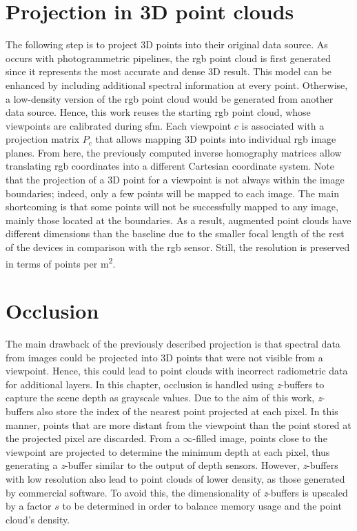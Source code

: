 \section{Projection in 3D point clouds}

The following step is to project 3D points into their original data source. As occurs with photogrammetric pipelines, the \acrshort{rgb} point cloud is first generated since it represents the most accurate and dense 3D result. This model can be enhanced by including additional spectral information at every point. Otherwise, a low-density version of the \acrshort{rgb} point cloud would be generated from another data source. Hence, this work reuses the starting \acrshort{rgb} point cloud, whose viewpoints are calibrated during \acrshort{sfm}. Each viewpoint $c$ is associated with a projection matrix $P_c$ that allows mapping 3D points into individual \acrshort{rgb} image planes. From here, the previously computed inverse homography matrices allow translating \acrshort{rgb} coordinates into a different Cartesian coordinate system. Note that the projection of a 3D point for a viewpoint is not always within the image boundaries; indeed, only a few points will be mapped to each image. The main shortcoming is that some points will not be successfully mapped to any image, mainly those located at the boundaries. As a result, augmented point clouds have different dimensions than the baseline due to the smaller focal length of the rest of the devices in comparison with the \acrshort{rgb} sensor. Still, the resolution is preserved in terms of points per \si{\meter\squared}.

\section{Occlusion}

The main drawback of the previously described projection is that spectral data from images could be projected into 3D points that were not visible from a viewpoint. Hence, this could lead to point clouds with incorrect radiometric data for additional layers. In this chapter, occlusion is handled using \textit{z}-buffers to capture the scene depth as grayscale values. Due to the aim of this work, \textit{z}-buffers also store the index of the nearest point projected at each pixel. In this manner, points that are more distant from the viewpoint than the point stored at the projected pixel are discarded.  From a $\infty$-filled image, points close to the viewpoint are projected to determine the minimum depth at each pixel, thus generating a \textit{z}-buffer similar to the output of depth sensors. However, \textit{z}-buffers with low resolution also lead to point clouds of lower density, as those generated by commercial software. To avoid this, the dimensionality of \textit{z}-buffers is upscaled by a factor $s$ to be determined in order to balance memory usage and the point cloud's density.


